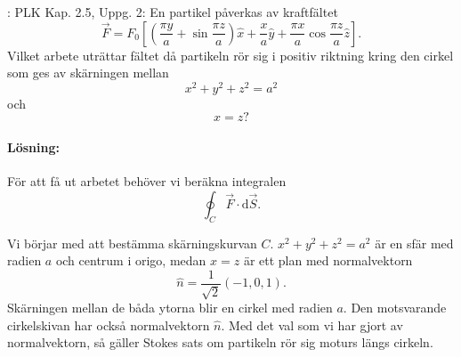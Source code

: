 \documentclass[%
oneside,                 %
final,                   %
10pt]{article}
\newcommand{\shortinlinecomment}[3]{{\color{red}{\bf #1}: #2}}
\newenvironment{notice_mdfboxadmon}[1][]{
\begin{notice_mdfboxmdframed}[frametitle=#1]
}
{
\end{notice_mdfboxmdframed}
}
\begin{document}
\begin{notice_mdfboxadmon}

\shortinlinecomment{Kommentar 3}{ PLK Kap. 2.5, Uppg. 2: }{ PLK Kap. 2.5, Uppg. }  En partikel påverkas av kraftfältet
\begin{equation}
  \vec{F} = F_0 \left[\left(\frac{\pi y}{a} + \sin \frac{\pi z}{a}\right)
\hat{x} + \frac{x}{a} \hat{y} + \frac{\pi x}{a} \cos \frac{\pi z}{a}
\hat{z}\right].
\end{equation}
Vilket arbete uträttar fältet då partikeln rör sig i positiv riktning kring den cirkel som ges av skärningen mellan
\begin{equation}
  x^2 + y^2 + z^2 = a^2
\end{equation}
och
\begin{equation}
  x = z?
\end{equation}

\paragraph{Lösning:}
För att få ut arbetet behöver vi beräkna integralen
\begin{equation}
  \oint_C \vec{F} \cdot \mbox{d}\vec{S}.
\end{equation}

Vi börjar med att bestämma skärningskurvan $C$.  $x^2 + y^2 + z^2 = a^2$ är en sfär med radien $a$ och centrum i origo, medan $x = z$ är ett plan med normalvektorn
\begin{equation}
  \hat{n} = \frac{1}{\sqrt{2}} \left(-1,0,1\right).
\end{equation}
Skärningen mellan de båda ytorna blir en cirkel med radien $a$.  Den motsvarande cirkelskivan har också normalvektorn $\hat{n}$.  Med det val som vi har gjort av normalvektorn, så gäller Stokes sats om partikeln rör sig moturs längs cirkeln.


\end{notice_mdfboxadmon}
\end{document}
